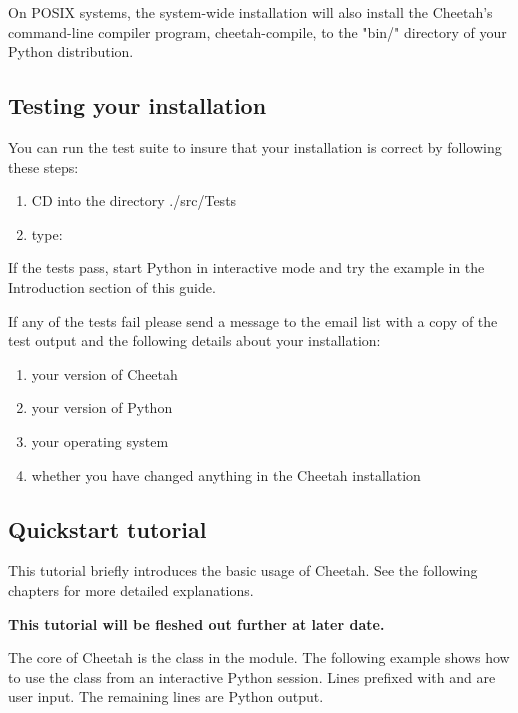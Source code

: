 On POSIX systems, the system-wide installation will also install the Cheetah's
command-line compiler program, cheetah-compile, to the "bin/" directory of your
Python distribution.  

\subsection{Testing your installation}
\label{gettingStarted.test}

You can run the test suite to insure that your installation is correct by
following these steps:
\begin{enumerate}
\item CD into the directory ./src/Tests   
\item type:  
\end{enumerate}

If the tests pass, start Python in interactive mode and try the example in the
Introduction section of this guide.

If any of the tests fail please send a message to the email list with a copy of
the test output and the following details about your installation:

\begin{enumerate}
\item your version of Cheetah
\item your version of Python
\item your operating system
\item whether you have changed anything in the Cheetah installation
\end{enumerate}

\subsection{Quickstart tutorial}
\label{gettingStarted.tutorial}

This tutorial briefly introduces the basic usage of Cheetah.  See the
following chapters for more detailed explanations.  

{\bf This tutorial will be fleshed out further at later date.} 

The core of Cheetah is the  class in the 
module. The following example shows how to use the  class from an
interactive Python session. Lines prefixed with \code{>>>} and  are
user input.  The remaining lines are Python output.

